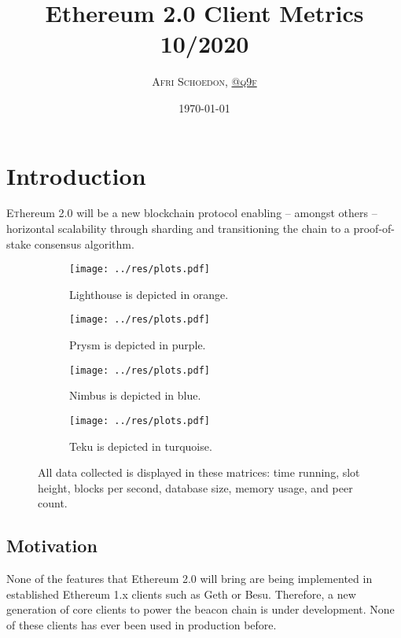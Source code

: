 \documentclass[twoside,twocolumn]{article}
\title{Ethereum 2.0 Client Metrics 10/2020}
\author{\textsc{Afri Schoedon, \href{https://github.com/q9f}{@q9f}}}\date{\today}
\begin{document}
\maketitle
\section{Introduction}
\lettrine[nindent=0em,lines=3]{E}thereum 2.0 will be a new blockchain protocol enabling -- amongst others -- horizontal scalability through sharding and transitioning the chain to a proof-of-stake consensus algorithm.\par

\begin{figure}
   \centering
   \begin{subfigure}[t]{0.48\textwidth}
     \centering
     \texttt{[image: ../res/plots.pdf]}
     \caption{Lighthouse is depicted in orange.}
     \label{img:lh}
   \end{subfigure}
   \begin{subfigure}[t]{0.48\textwidth}
     \centering
     \texttt{[image: ../res/plots.pdf]}
     \caption{Prysm is depicted in purple.}
     \label{img:pr}
   \end{subfigure}
   \begin{subfigure}[t]{0.48\textwidth}
     \centering
     \texttt{[image: ../res/plots.pdf]}
     \caption{Nimbus is depicted in blue.}
     \label{img:nb}
   \end{subfigure}
   \begin{subfigure}[t]{0.48\textwidth}
     \centering
     \texttt{[image: ../res/plots.pdf]}
     \caption{Teku is depicted in turquoise.}
     \label{img:tk}
   \end{subfigure}
  \caption{All data collected is displayed in these matrices: time running, slot height, blocks per second, database size, memory usage, and peer count.}
  \label{fig:cli}
\end{figure}

\subsection{Motivation}
None of the features that Ethereum 2.0 will bring are being implemented in established Ethereum 1.x clients such as Geth or Besu. Therefore, a new generation of core clients to power the beacon chain is under development. None of these clients has ever been used in production before.\par
\end{document}
